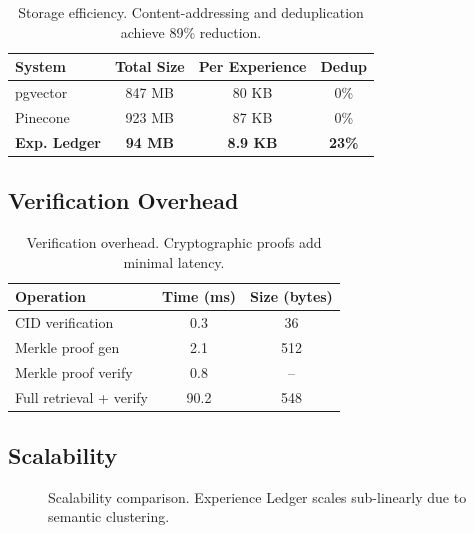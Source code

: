 \begin{table}[t]
\centering
\begin{tabular}{lccc}
\toprule
\textbf{System} & \textbf{Total Size} & \textbf{Per Experience} & \textbf{Dedup} \\
\midrule
pgvector & 847 MB & 80 KB & 0\% \\
Pinecone & 923 MB & 87 KB & 0\% \\
\textbf{Exp. Ledger} & \textbf{94 MB} & \textbf{8.9 KB} & \textbf{23\%} \\
\bottomrule
\end{tabular}
\caption{Storage efficiency. Content-addressing and deduplication achieve 89\% reduction.}
\label{tab:storage-eff}
\end{table}

\subsection{Verification Overhead}

\begin{table}[t]
\centering
\begin{tabular}{lcc}
\toprule
\textbf{Operation} & \textbf{Time (ms)} & \textbf{Size (bytes)} \\
\midrule
CID verification & 0.3 & 36 \\
Merkle proof gen & 2.1 & 512 \\
Merkle proof verify & 0.8 & -- \\
Full retrieval + verify & 90.2 & 548 \\
\bottomrule
\end{tabular}
\caption{Verification overhead. Cryptographic proofs add minimal latency.}
\label{tab:verify}
\end{table}

\subsection{Scalability}

\begin{figure}[t]
\centering
{}
\caption{Scalability comparison. Experience Ledger scales sub-linearly due to semantic clustering.}
\label{fig:scalability}
\end{figure}

